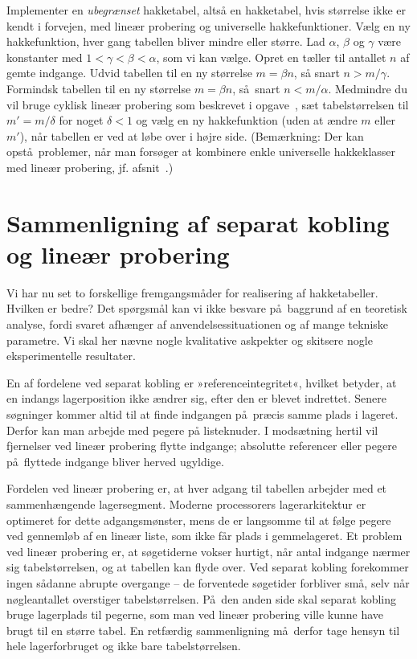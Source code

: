 \begin{exerc}
  Implementer en \emph{ubegrænset} hakketabel, altså en hakketabel, hvis størrelse ikke er kendt i forvejen, med lineær probering og universelle hakkefunktioner.
  Vælg en ny hakkefunktion, hver gang tabellen bliver mindre eller større.
  Lad $\alpha$, $\beta$ og $\gamma$ være konstanter med $1<\gamma<\beta<\alpha$, som vi kan vælge.
  Opret en tæller til antallet $n$ af gemte indgange.
  Udvid tabellen til en ny størrelse $m=\beta n$, så snart $n>m/\gamma$.
  Formindsk tabellen til en ny størrelse $m=\beta n$, så snart $n<m/\alpha$.
  Medmindre du vil bruge cyklisk lineær probering som beskrevet i opgave~, sæt tabelstørrelsen til $m'=m/\delta$ for noget $\delta<1$ og vælg en ny hakkefunktion (uden at ændre $m$ eller $m'$), når tabellen er ved at løbe over i højre side.
  (Bemærkning: Der kan opstå problemer, når man forsøger at kombinere enkle universelle hakkeklasser med lineær probering, jf. afsnit~.)
\end{exerc}

\section{Sammenligning af separat kobling og lineær probering}
%
Vi har nu set to forskellige fremgangsmåder for realisering af hakketabeller.
Hvilken er bedre?
Det spørgsmål kan vi ikke besvare på baggrund af en teoretisk analyse, fordi svaret afhænger af anvendelsessituationen og af mange tekniske parametre.
Vi skal her nævne nogle kvalitative askpekter og skitsere nogle eksperimentelle resultater.

En af fordelene ved separat kobling er »referenceintegritet«,
hvilket betyder, at en indangs lagerposition ikke ændrer sig, efter den er blevet indrettet.
Senere søgninger kommer altid til at finde indgangen på præcis samme plads i lageret.
Derfor kan man arbejde med pegere på listeknuder.
I modsætning hertil vil fjernelser ved lineær probering flytte indgange; absolutte referencer eller pegere på flyttede indgange bliver herved ugyldige.

Fordelen ved lineær probering er, at hver adgang til tabellen arbejder med et sammenhængende lagersegment.
Moderne processorers lagerarkitektur er optimeret for dette adgangsmønster, mens de er langsomme til at følge pegere ved gennemløb af en lineær liste, som ikke får plads i gemmelageret.
Et problem ved lineær probering er, at søgetiderne vokser hurtigt, når antal indgange nærmer sig tabelstørrelsen, og at tabellen kan flyde over.
Ved separat kobling forekommer ingen sådanne abrupte overgange -- de forventede søgetider forbliver små, selv når nøgleantallet overstiger tabelstørrelsen.
På den anden side skal separat kobling bruge lagerplads til pegerne, som man ved lineær probering ville kunne have brugt til en større tabel.
En retfærdig sammenligning må derfor tage hensyn til hele lagerforbruget og ikke bare tabelstørrelsen.

